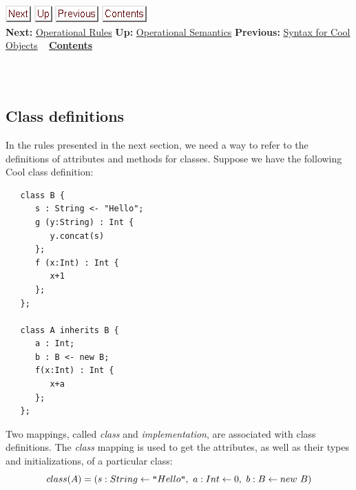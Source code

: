 \documentclass[]{article}
\begin{document}
\href{node48.html}{\includegraphics{next.png}}
\href{node44.html}{\includegraphics{up.png}}
\href{node46.html}{\includegraphics{prev.png}}
\href{node1.html}{\includegraphics{contents.png}} \\ \textbf{Next:}
\href{node48.html}{Operational Rules} \textbf{Up:}
\href{node44.html}{Operational Semantics} \textbf{Previous:}
\href{node46.html}{Syntax for Cool Objects} ~
\textbf{\href{node1.html}{Contents}} \\ \\

\subsection{\\ Class definitions}

In the rules presented in the next section, we need a way to refer to
the definitions of attributes and methods for classes. Suppose we have
the following Cool class definition:

\begin{verbatim}
   class B {
      s : String <- "Hello";
      g (y:String) : Int {
         y.concat(s)
      };
      f (x:Int) : Int {
         x+1
      };
   };

   class A inherits B {
      a : Int;
      b : B <- new B;
      f(x:Int) : Int {
         x+a
      };
   };
\end{verbatim}

Two mappings, called \emph{class} and \emph{implementation}, are
associated with class definitions. The \emph{class} mapping is used to
get the attributes, as well as their types and initializations, of a
particular class: \\

\begin{displaymath}
class(A) = (s : String \leftarrow \mbox {\tt ''}Hello \mbox {\tt ''},\ a : Int
\leftarrow 0,\ b : B \leftarrow new\ B)
\end{displaymath}
\end{document}
